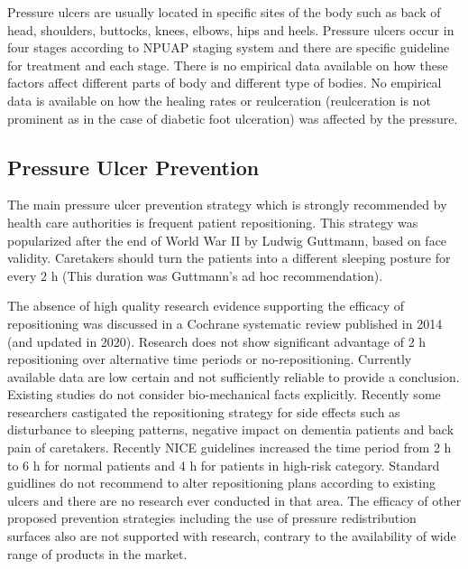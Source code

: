 Pressure ulcers are usually located in specific sites of the body such as back of head, shoulders, buttocks,  knees, elbows, hips and heels.  Pressure ulcers occur in four stages according to NPUAP staging system and there are specific guideline for treatment and each stage. There is no empirical data available on how these factors affect different parts of body and different type of bodies. No empirical data is available on how the healing rates or reulceration (reulceration is not prominent as in the case of diabetic foot ulceration) was affected by the pressure. 

\subsection{Pressure Ulcer Prevention}
The main pressure ulcer prevention strategy which is strongly recommended by health care authorities is frequent patient repositioning. This strategy was popularized after the end of World War II by Ludwig Guttmann, based on face validity. Caretakers should turn the patients into a different sleeping posture for every 2 h (This duration was Guttmann's ad hoc recommendation). 

The absence of high quality research evidence supporting the efficacy of repositioning was discussed in a Cochrane systematic review published in 2014 (and updated in 2020). Research does not show significant advantage of 2 h repositioning over alternative time periods or no-repositioning. Currently available data are low certain and not sufficiently reliable to provide a conclusion. Existing studies do not consider bio-mechanical facts explicitly. Recently some researchers castigated the repositioning strategy for side effects such as disturbance to sleeping patterns, negative impact on dementia patients and back pain of caretakers. Recently NICE guidelines increased the time period from 2 h to 6 h for normal patients and 4 h for patients in high-risk category. Standard guidlines do not recommend to alter repositioning plans according to existing ulcers and there are no research ever conducted in that area. The efficacy of other proposed prevention strategies including the use of pressure redistribution surfaces also are not supported with research, contrary to the availability of wide range of products in the market.

